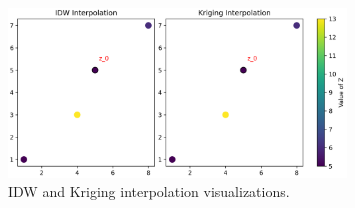 \documentclass{article}
\begin{document}
\begin{figure}[H]
\centering
\includegraphics[width=0.8\textwidth]{spatial_interpolation.png}
\caption{IDW and Kriging interpolation visualizations.}
\end{figure}
\end{document}
